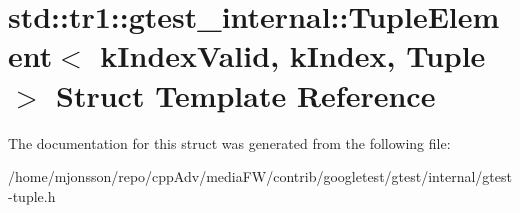 \hypertarget{structstd_1_1tr1_1_1gtest__internal_1_1TupleElement}{}\section{std\+:\+:tr1\+:\+:gtest\+\_\+internal\+:\+:Tuple\+Element$<$ k\+Index\+Valid, k\+Index, Tuple $>$ Struct Template Reference}
\label{structstd_1_1tr1_1_1gtest__internal_1_1TupleElement}


The documentation for this struct was generated from the following file\+:\begin{DoxyCompactItemize}
\item 
/home/mjonsson/repo/cpp\+Adv/media\+F\+W/contrib/googletest/gtest/internal/gtest-\/tuple.\+h\end{DoxyCompactItemize}
